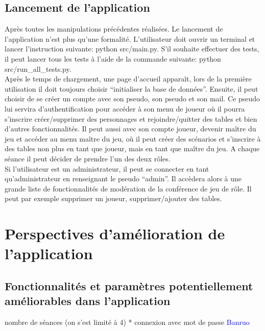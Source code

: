 \documentclass[11pt]{article}
\begin{document}
\newpage
\subsection{Lancement de l'application}

Après toutes les manipulations précédentes réalisées. Le lancement de l’application n’est plus qu’une formalité. L'utilisateur doit ouvrir un terminal et lancer l’instruction suivante: python src/main.py. S’il souhaite effectuer des tests, il peut lancer tous les tests à l'aide de la commande suivante:
python src/run\_all\_tests.py. \\

Après le temps de chargement, une page d’accueil apparaît, lors de la première utilisation il doit toujours choisir “initialiser la base de données”. Ensuite, il peut choisir de se créer un compte avec son pseudo, son pseudo et son mail. Ce pseudo lui servira d’authentification pour accéder à son menu de joueur où il pourra s’inscrire créer/supprimer des personnages et rejoindre/quitter des tables et bien d’autres fonctionnalités. Il peut aussi avec son compte joueur, devenir maître du jeu et accéder au menu maître du jeu, où il peut créer des scénarios et s’inscrire à des tables non plus en tant que joueur, mais en tant que maître du jeu. A chaque séance il peut décider de prendre l’un des deux rôles.\\

Si l'utilisateur est un administrateur, il peut se connecter en tant qu’administrateur en renseignant le pseudo “admin”. Il accèdera alors à une grande liste de fonctionnalités de modération de la conférence de jeu de rôle. Il peut par exemple supprimer un joueur, supprimer/ajouter des tables.






\newpage
\section{Perspectives d'amélioration de l'application}

\subsection{Fonctionnalités et paramètres potentiellement améliorables dans l'application}
nombre de séances (on s'est limité à 4)
* connexion avec mot de passe
\textcolor{blue}{Banruo}
\end{document}
